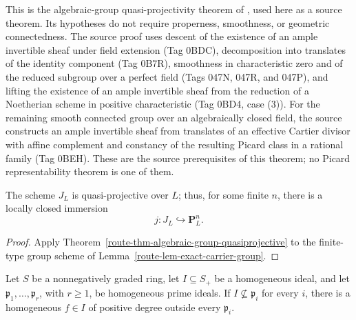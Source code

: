 This is the algebraic-group quasi-projectivity theorem of
\cite[Tag 0BF7]{stacks-project}, used here as a source theorem. Its
hypotheses do not require properness, smoothness, or geometric
connectedness. The source proof uses descent of the existence of an ample
invertible sheaf under field extension (Tag 0BDC), decomposition into
translates of the identity component (Tag 0B7R), smoothness in
characteristic zero and of the reduced subgroup over a perfect field
(Tags 047N, 047R, and 047P), and lifting the existence of an ample
invertible sheaf from the reduction of a Noetherian scheme in positive
characteristic (Tag 0BD4, case (3)). For the remaining smooth connected group
over an algebraically closed field, the source constructs an ample
invertible sheaf from translates of an effective Cartier divisor with
affine complement and constancy of the resulting Picard class in a
rational family (Tag 0BEH). These are the source prerequisites of this
theorem; no Picard representability theorem is one of them.

\begin{corollary}
  \label{route-thm-exact-carrier-quasiprojective}
  \notready

  The scheme \(J_L\) is quasi-projective over \(L\); thus, for some
  finite \(n\), there is a locally closed immersion
  \[
    j:J_L\hookrightarrow\mathbf P^n_L.
    \tag{QP}
  \]
\end{corollary}

\begin{proof}
  Apply Theorem~\ref{route-thm-algebraic-group-quasiprojective} to the
  finite-type group scheme of Lemma~\ref{route-lem-exact-carrier-group}.
\end{proof}

\begin{lemma}
  \label{route-lem-homogeneous-prime-avoidance}
  \notready

  Let \(S\) be a nonnegatively graded ring, let \(I\subseteq S_+\) be
  a homogeneous ideal, and let
  \(\mathfrak p_1,\ldots,\mathfrak p_r\), with \(r\geq1\), be
  homogeneous prime ideals. If \(I\nsubseteq\mathfrak p_i\) for every
  \(i\), there is a homogeneous \(f\in I\) of positive degree outside
  every \(\mathfrak p_i\).
\end{lemma}

